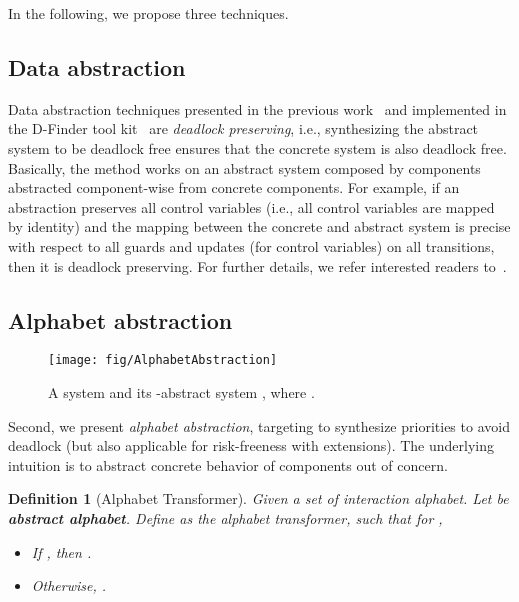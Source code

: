 \documentclass[10pt, a4paper, onecolumn, conference, compsocconf]{IEEEtran}
\newtheorem{defi}{Definition}
\begin{document}
In the following, we propose three techniques.

\subsection{Data abstraction\label{subsec.algo.prioritysyn.dp.abstraction}}

Data abstraction techniques presented in the previous work~\cite{bensalem2008compositional} and implemented in the D-Finder tool kit~\cite{bensalem:dfinder2:2011} are \emph{deadlock preserving}, i.e., synthesizing the abstract system to be deadlock free ensures that the concrete system is also deadlock free. Basically, the method works on an abstract system composed by components abstracted component-wise from concrete components. For example, if an abstraction preserves all control variables (i.e., all control variables are mapped by identity) and the mapping between the concrete and abstract system is precise with respect to all guards and updates (for control variables) on all transitions, then it is deadlock preserving. For further details, we refer interested readers to~\cite{bensalem2008compositional,bensalem:dfinder2:2011}.

\subsection{Alphabet abstraction\label{subsec.algo.prioritysyn.alphabet}}

\begin{figure}
\centering
 \texttt{[image: fig/AlphabetAbstraction]}
  \caption{A system  and its -abstract system , where .}
 \label{fig:vissbip.alphabet.abstraction}
\end{figure}


Second, we present \emph{alphabet abstraction}, targeting to synthesize priorities to avoid deadlock
(but also applicable for risk-freeness with extensions). The underlying intuition is to abstract concrete behavior of
components out of concern.

\begin{defi}[Alphabet Transformer]
Given a set  of interaction alphabet. Let  be \textbf{abstract alphabet}.
Define  as the alphabet transformer, such that
for ,
\begin{itemize}
    \item If , then .
    \item Otherwise, .
\end{itemize}
\end{defi}
\end{document}
